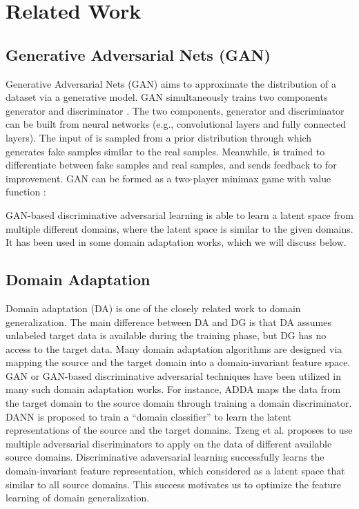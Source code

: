 \documentclass[twocolumn,preprint]{elsarticle}
\begin{document}
\section{Related Work}\label{section:related_work}


\subsection{Generative Adversarial Nets (GAN)} \label{sub:GAN}
Generative Adversarial Nets (GAN) \cite{gan} aims to approximate the distribution  of a dataset via a generative model. GAN simultaneously trains two components generator  and discriminator . The two components, generator and discriminator can be built from neural networks (e.g., convolutional layers and fully connected layers). The input of  is sampled from a prior distribution  through which  generates fake samples similar to the real samples. Meanwhile,  is trained to differentiate between fake samples and real samples, and sends feedback to  for improvement. GAN can be formed as a two-player minimax game with value function :



GAN-based discriminative adversarial learning is able to learn a latent space from multiple different domains, where the latent space is similar to the given domains. It has been used in some domain adaptation works, which we will discuss below.



\subsection{Domain Adaptation} \label{sub:DA}
Domain adaptation (DA) is one of the closely related work to domain generalization. The main difference between DA and DG is that DA assumes unlabeled target data is available during the training phase, but DG has no access to the target data. Many domain adaptation algorithms \cite{adda, dann, unsupervised-DA, sim-domain} are designed via mapping the source and the target domain into a domain-invariant feature space. GAN or GAN-based discriminative adversarial techniques have been utilized in many such domain adaptation works. For instance, ADDA \cite{adda} maps the data from the target domain to the source domain through training a domain discriminator. DANN \cite{dann} is proposed to train a ``domain classifier'' to learn the latent representations of the source and the target domains. Tzeng et al. \cite{sim-domain} proposes to use multiple adversarial discriminators to apply on the data of different available source domains. 
Discriminative adaversarial learning successfully learns the domain-invariant feature representation, which considered as a latent space that similar to all source domains. 
This success motivates us to optimize the feature learning of domain generalization.
\end{document}
